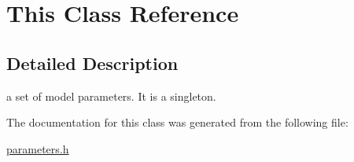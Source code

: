 \hypertarget{classThis}{}\section{This Class Reference}
\label{classThis}


\subsection{Detailed Description}
a set of model parameters. It is a singleton. 

The documentation for this class was generated from the following file\+:\begin{DoxyCompactItemize}
\item 
\mbox{\hyperlink{parameters_8h}{parameters.\+h}}\end{DoxyCompactItemize}
